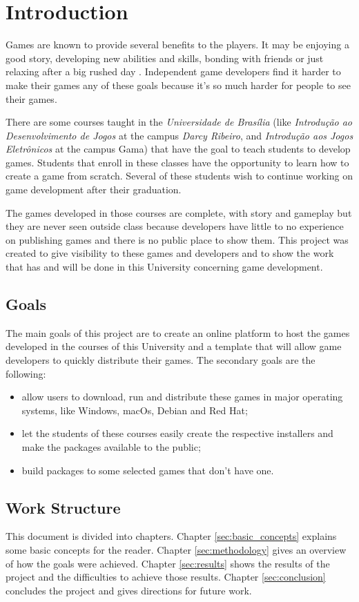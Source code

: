 \chapter*[Introduction]{Introduction}

Games are known to provide several benefits to the players. It may be enjoying a good story, developing new abilities and skills, bonding with friends or just relaxing after a big rushed day \cite{sandford2005games}. Independent game developers find it harder to make their games any of these goals because it's so much harder for people to see their games.

There are some courses taught in the \textit{Universidade de Brasília} (like \textit{Introdução ao Desenvolvimento de Jogos} at the campus \textit{Darcy Ribeiro}, and \textit{Introdução aos Jogos Eletrônicos} at the campus Gama) that have the goal to teach students to develop games. Students that enroll in these classes have the opportunity to learn how to create a game from scratch. Several of these students wish to continue working on game development after their graduation.

The games developed in those courses are complete, with story and gameplay but they are never seen outside class because developers have little to no experience on publishing games and there is no public place to show them. This project was created to give visibility to these games and developers and to show the work that has and will be done in this University concerning game development.

\section*{Goals}

The main goals of this project are to create an online platform to host the games developed in the courses of this University and a template that will allow game developers to quickly distribute their games. The secondary goals are the following:

\begin{itemize}
\item allow users to download, run and distribute these games in major operating systems, like Windows, macOs, Debian and Red Hat;
\item let the students of these courses easily create the respective installers and make the packages available to the public;
\item build packages to some selected games that don't have one.
\end{itemize}

\section*{Work Structure}

This document is divided into chapters. Chapter \ref{sec:basic_concepts} explains some basic concepts for the reader. Chapter \ref{sec:methodology} gives an overview of how the goals were achieved. Chapter \ref{sec:results} shows the results of the project and the difficulties to achieve those results. Chapter \ref{sec:conclusion} concludes the project and gives directions for future work.
